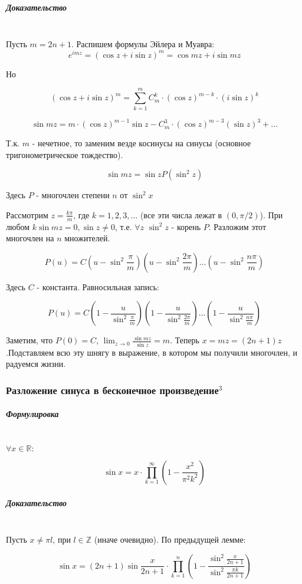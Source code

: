 \documentclass{article}
\let\vanillasubparagraph\subparagraph
\renewcommand{\subparagraph}[1]{\vanillasubparagraph{#1}\mbox{}\\}
\begin{document}
\subparagraph{Доказательство}

Пусть $m=2n+1$. Распишем формулы Эйлера и Муавра:
$$
e^{imz} = (\cos{z} + i\sin{z})^m = \cos{mz} + i\sin{mz}
$$

Но 

$$
(\cos{z} + i\sin{z})^m = \sum_{k=1}^m C_m^k\cdot (\cos{z})^{m-k} \cdot (i\sin{z})^k
$$

$$
\sin{mz} = m \cdot (\cos{z})^{m-1}\sin{z} - C_m^3 \cdot (\cos{z})^{m-3}(\sin{z})^3 + \dots
$$

Т.к. $m$ - нечетное, то заменим везде косинусы на синусы (основное тригонометрическое тождество). 

$$
\sin{mz} = \sin{z} P(\sin^2{z})
$$

Здесь $P$ - многочлен степени $n$ от $\sin^2{x}$

Рассмотрим $z = \frac{k\pi}{m}$, где $k = 1, 2, 3, \dots$ (все эти числа лежат в $(0, \pi/2)$). При любом $k \sin{mz} = 0, \sin{z} \neq 0$, т.е. $\forall z$ $\sin^2{z}$ - корень $P$. Разложим этот многочлен на $n$ множителей. 

$$
P(u) = C\left(u - \sin^2{\frac{\pi}{m}}\right)\left(u - \sin^2{\frac{2\pi}{m}}\right) \dots \left(u - \sin^2{\frac{n\pi}{m}}\right)
$$

Здесь $C$ - константа. Равносильная запись:

$$
P(u) = C\left(1 - \frac{u}{\sin^2{\frac{\pi}{m}}}\right)\left(1 - \frac{u}{\sin^2{\frac{2\pi}{m}}}\right)\dots \left(1 - \frac{u}{\sin^2{\frac{n\pi}{m}}}\right)
$$

Заметим, что $P(0) = C$, $\lim_{z\to 0} {\frac{\sin{mz}}{\sin{z}}} = m$. Теперь $x = mz = (2n+1)z$.Подставляем всю эту шнягу в выражение, в котором мы получили многочлен, и радуемся жизни.

\subsubsection{Разложение синуса в бесконечное произведение\texorpdfstring{$^3$}{}}

\subparagraph{Формулировка}
$\forall x\in \mathbb R:$

$$
\sin{x} = x \cdot \prod_{k=1}^\infty \left(1 - \frac{x^2}{\pi^2 k^2}\right)
$$

\subparagraph{Доказательство}

Пусть $x \neq \pi l$, при $l \in \mathbb Z$ (иначе очевидно). По предыдущей лемме:

$$
\sin{x} = (2n + 1)\sin{\frac{x}{2n+1}}\cdot \prod_{k=1}^n\left(1 - \frac{\sin^2{\frac{x}{2n+1}}}{\sin^2\frac{\pi k}{2n+1}}\right)
$$
\end{document}
